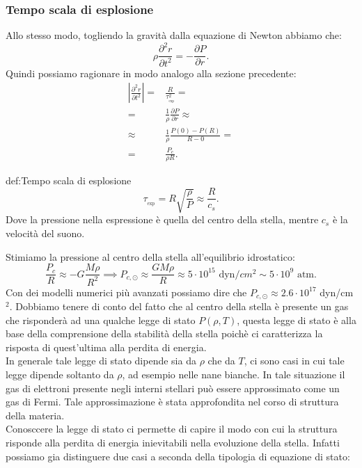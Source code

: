 \subsubsection{Tempo scala di esplosione}
\label{subsubsec:Tempo scala di esplosione}
Allo stesso modo, togliendo la gravità dalla equazione di Newton abbiamo che:
\[
	\rho  \frac{\partial ^2 r}{\partial t^2} 
	=
	-\frac{\partial P}{\partial r} 
.\] 
Quindi possiamo ragionare in modo analogo alla sezione precedente:
\[\begin{aligned}
	\left| \frac{\partial ^2 r}{\partial t^2}  \right| 
	=&
	\frac{R}{\tau_{_\text{exp}}^2} =\\
	=&
	\frac{1}{\rho}\frac{\partial P}{\partial r} \approx \\
	\approx &
	\frac{1}{\rho  }\frac{P(0)-P(R)}{R-0} =\\
	=& 
	\frac{P_c}{\rho R}
.\end{aligned}\]
\begin{defn}{def:Tempo scala di esplosione}
	\[
		\tau_{_\text{exp}}= 
		R\sqrt{\frac{\rho}{P}} \approx
		\frac{R}{c_s}
	.\] 
	Dove la pressione nella espressione è quella del centro della stella, mentre $c_s$ è la velocità del suono.
\end{defn}
Stimiamo la pressione al centro della stella all'equilibrio idrostatico:
\[
	\frac{P_c}{R}\approx -G\frac{M\rho}{R^2}\implies
	P_{c,\odot} \approx \frac{GM\rho  }{R} \approx 5 \cdot 10^{15} \text{ dyn}/cm^2 \sim 5 \cdot 10^{9}  \text{ atm}
.\] 
Con dei modelli numerici più avanzati possiamo dire che $P_{c,\odot} \approx 2.6 \cdot 10^{17}$ dyn/cm$^2$. 
Dobbiamo tenere di conto del fatto che al centro della stella è presente un gas che risponderà ad una qualche legge di stato $P(\rho,T)$, questa legge di stato è alla base della comprensione della stabilità della stella poichè ci caratterizza la risposta di quest'ultima alla perdita di energia.\\
In generale tale legge di stato dipende sia da $\rho $ che da $T$, ci sono casi in cui tale legge dipende soltanto da $\rho $, ad esempio nelle nane bianche. In tale situazione il gas di elettroni presente negli interni stellari può essere approssimato come un gas di Fermi. Tale approssimazione è stata approfondita nel corso di struttura della materia.\\
Conosccere la legge di stato ci permette di capire il modo con cui la struttura risponde alla perdita di energia inievitabili nella evoluzione della stella. Infatti possiamo gia distinguere due casi a seconda della tipologia di equazione di stato:

